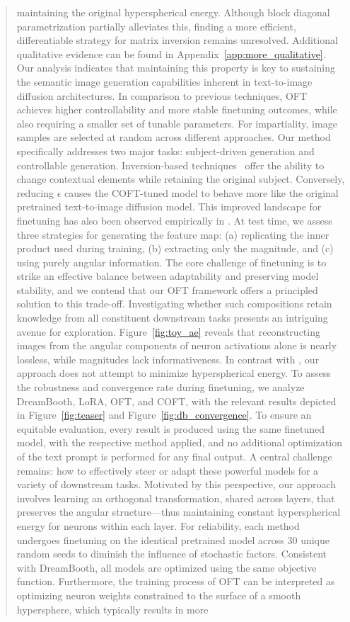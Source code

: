 \begin{itemize}[leftmargin=*,nosep]
\begin{abstract}
maintaining the original hyperspherical energy. Although block diagonal parametrization partially alleviates this, finding a more efficient, differentiable strategy for matrix inversion remains unresolved. Additional qualitative evidence can be found in Appendix~\ref{app:more_qualitative}. Our analysis indicates that maintaining this property is key to sustaining the semantic image generation capabilities inherent in text-to-image diffusion architectures. In comparison to previous techniques, OFT achieves higher controllability and more stable finetuning outcomes, while also requiring a smaller set of tunable parameters. For impartiality, image samples are selected at random across different approaches. Our method specifically addresses two major tasks: subject-driven generation and controllable generation. Inversion-based techniques~\cite{choi2021ilvr,dhariwal2021diffusion,ramesh2022hierarchical,gal2022image} offer the ability to change contextual elements while retaining the original subject. Conversely, reducing $\epsilon$ causes the COFT-tuned model to behave more like the original pretrained text-to-image diffusion model. This improved landscape for finetuning has also been observed empirically in \cite{liu2021orthogonal}. At test time, we assess three strategies for generating the feature map: (a) replicating the inner product used during training, (b) extracting only the magnitude, and (c) using purely angular information. The core challenge of finetuning is to strike an effective balance between adaptability and preserving model stability, and we contend that our OFT framework offers a principled solution to this trade-off. Investigating whether such compositions retain knowledge from all constituent downstream tasks presents an intriguing avenue for exploration. Figure~\ref{fig:toy_ae} reveals that reconstructing images from the angular components of neuron activations alone is nearly lossless, while magnitudes lack informativeness. In contrast with \cite{liu2021orthogonal}, our approach does not attempt to minimize hyperspherical energy. To assess the robustness and convergence rate during finetuning, we analyze DreamBooth, LoRA, OFT, and COFT, with the relevant results depicted in Figure~\ref{fig:teaser} and Figure~\ref{fig:db_convergence}. To ensure an equitable evaluation, every result is produced using the same finetuned model, with the respective method applied, and no additional optimization of the text prompt is performed for any final output. A central challenge remains: how to effectively steer or adapt these powerful models for a variety of downstream tasks. Motivated by this perspective, our approach involves learning an orthogonal transformation, shared across layers, that preserves the angular structure—thus maintaining constant hyperspherical energy for neurons within each layer. For reliability, each method undergoes finetuning on the identical pretrained model across 30 unique random seeds to diminish the influence of stochastic factors. Consistent with DreamBooth, all models are optimized using the same objective function. Furthermore, the training process of OFT can be interpreted as optimizing neuron weights constrained to the surface of a smooth hypersphere, which typically results in more 
\end{abstract}
\end{itemize}

